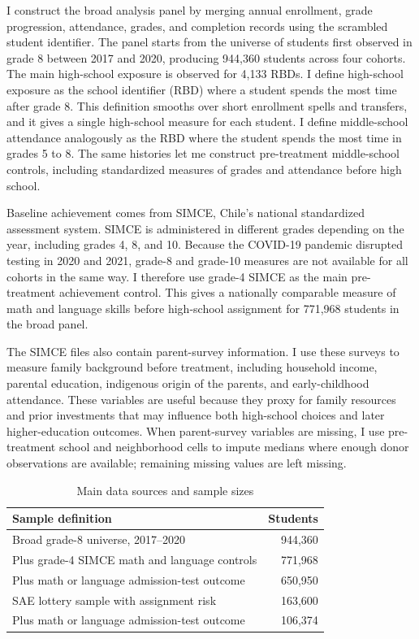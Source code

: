 \documentclass[a4paper, article, english, oneside, unknownkeysallowed, 12pt]{memoir}
\begin{document}
I construct the broad analysis panel by merging annual enrollment, grade progression, attendance, grades, and completion records using the scrambled student identifier.
The panel starts from the universe of students first observed in grade 8 between 2017 and 2020, producing 944,360 students across four cohorts.
The main high-school exposure is observed for 4,133 RBDs.
I define high-school exposure as the school identifier (RBD) where a student spends the most time after grade 8.
This definition smooths over short enrollment spells and transfers, and it gives a single high-school measure for each student.
I define middle-school attendance analogously as the RBD where the student spends the most time in grades 5 to 8.
The same histories let me construct pre-treatment middle-school controls, including standardized measures of grades and attendance before high school.

Baseline achievement comes from SIMCE, Chile's national standardized assessment system.
SIMCE is administered in different grades depending on the year, including grades 4, 8, and 10.
Because the COVID-19 pandemic disrupted testing in 2020 and 2021, grade-8 and grade-10 measures are not available for all cohorts in the same way.
I therefore use grade-4 SIMCE as the main pre-treatment achievement control.
This gives a nationally comparable measure of math and language skills before high-school assignment for 771,968 students in the broad panel.

The SIMCE files also contain parent-survey information.
I use these surveys to measure family background before treatment, including household income, parental education, indigenous origin of the parents, and early-childhood attendance.
These variables are useful because they proxy for family resources and prior investments that may influence both high-school choices and later higher-education outcomes.
When parent-survey variables are missing, I use pre-treatment school and neighborhood cells to impute medians where enough donor observations are available; remaining missing values are left missing.

\begin{table}[H]
\centering
\caption{Main data sources and sample sizes}
\label{tab:data-samples}
\begin{tabular}{lr}
\toprule
Sample definition & Students \\
\midrule
Broad grade-8 universe, 2017--2020 & 944,360 \\
Plus grade-4 SIMCE math and language controls & 771,968 \\
Plus math or language admission-test outcome & 650,950 \\
\midrule
SAE lottery sample with assignment risk & 163,600 \\
Plus math or language admission-test outcome & 106,374 \\
\bottomrule
\end{tabular}
\end{table}
\end{document}
